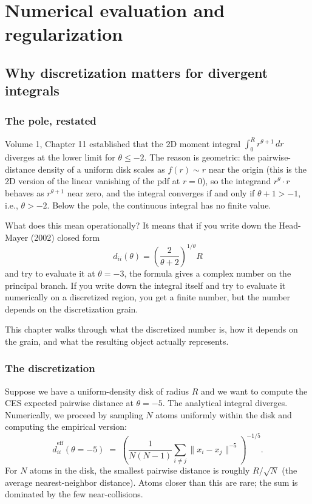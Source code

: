 \documentclass[11pt,letterpaper,oneside]{book}
\theoremstyle{definition}
\theoremstyle{remark}
\newcommand{\eff}{\mathrm{eff}}
\begin{document}
\part{Numerical evaluation and regularization}

\chapter{Why discretization matters for divergent integrals}
\label{ch:discretization}

\section{The pole, restated}

Volume 1, Chapter 11 established that the 2D moment integral
$\int_0^R r^{\theta+1}\, dr$ diverges at the lower limit for $\theta \leq -2$.
The reason is geometric: the pairwise-distance density of a uniform disk
scales as $f(r) \sim r$ near the origin (this is the 2D version of the
linear vanishing of the pdf at $r = 0$), so the integrand $r^\theta \cdot r$
behaves as $r^{\theta+1}$ near zero, and the integral converges if and
only if $\theta + 1 > -1$, i.e., $\theta > -2$. Below the pole, the
continuous integral has no finite value.

What does this mean operationally? It means that if you write down the
Head-Mayer (2002) closed form
$$d_{ii}(\theta) = \left(\frac{2}{\theta + 2}\right)^{1/\theta} R$$
and try to evaluate it at $\theta = -3$, the formula gives a complex
number on the principal branch. If you write down the integral itself
and try to evaluate it numerically on a discretized region, you get a
finite number, but the number depends on the discretization grain.

This chapter walks through what the discretized number is, how it depends
on the grain, and what the resulting object actually represents.

\section{The discretization}

Suppose we have a uniform-density disk of radius $R$ and we want to
compute the CES expected pairwise distance at $\theta = -5$. The
analytical integral diverges. Numerically, we proceed by sampling
$N$ atoms uniformly within the disk and computing the empirical version:
\begin{equation}
\hat{d}_{ii}^{\eff}(\theta = -5) \;=\; \left( \frac{1}{N(N-1)} \sum_{i \neq j} \|x_i - x_j\|^{-5} \right)^{-1/5}.
\end{equation}
For $N$ atoms in the disk, the smallest pairwise distance is roughly
$R/\sqrt{N}$ (the average nearest-neighbor distance). Atoms closer than
this are rare; the sum is dominated by the few near-collisions.
\end{document}
